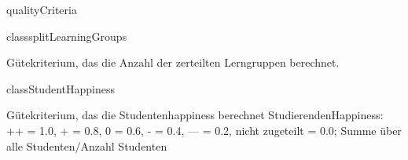 \begin{texdocpackage}{qualityCriteria}
\begin{texdocclass}{class}{splitLearningGroups}
\label{texdoclet:qualityCriteria.splitLearningGroups}
\begin{texdocclassintro}
Gütekriterium, das die Anzahl der zerteilten Lerngruppen berechnet.\end{texdocclassintro}
\begin{texdocclassconstructors}
\end{texdocclassconstructors}
\begin{texdocclassmethods}
\end{texdocclassmethods}
\end{texdocclass}


\begin{texdocclass}{class}{StudentHappiness}
\label{texdoclet:qualityCriteria.StudentHappiness}
\begin{texdocclassintro}
Gütekriterium, das die Studentenhappiness berechnet 
 StudierendenHappiness:
++ = 1.0,
+ = 0.8,
0 = 0.6,
- = 0.4,
— = 0.2,
nicht zugeteilt = 0.0;
Summe über alle Studenten$/$Anzahl Studenten\end{texdocclassintro}
\begin{texdocclassconstructors}
\end{texdocclassconstructors}
\begin{texdocclassmethods}
\end{texdocclassmethods}
\end{texdocclass}


\end{texdocpackage}



